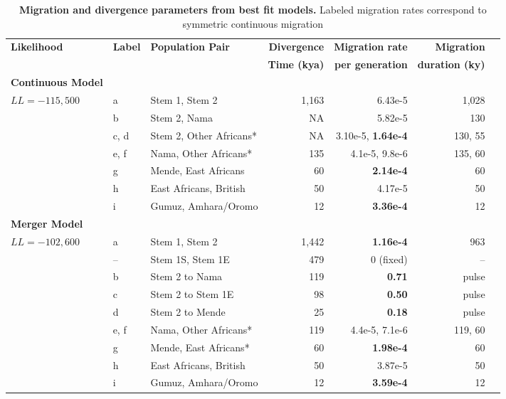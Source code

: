 \documentclass[]{article}
\begin{document}
\begin{table}[t!]
    \centering
    \scriptsize
    \begin{tabular}{lllrrrr}
        \toprule
        \textbf{Likelihood} & \textbf{Label} & \textbf{Population Pair} &
            \textbf{Divergence} & \textbf{Migration rate} & \textbf{Migration} \\
        & & & 
            \textbf{Time (kya)} & \textbf{per generation} & \textbf{duration (ky)} \\
        \midrule
        \textbf{Continuous Model} & & & & & \\
        $LL= -115,500$ & a & Stem 1, Stem 2 & 1,163 & 6.43e-5 & 1,028 \\
        & b & Stem 2, Nama & NA & 5.82e-5 & 130 \\
        & c, d & Stem 2, Other Africans* & NA & 3.10e-5, \textbf{1.64e-4} & 130, 55 \\
        & e, f & Nama, Other Africans* & 135 & 4.1e-5, 9.8e-6 & 135, 60 \\
        & g & Mende, East Africans & 60 & \textbf{2.14e-4} & 60 \\
        & h & East Africans, British & 50 & 4.17e-5 & 50 \\
        & i & Gumuz, Amhara/Oromo & 12 &\textbf{3.36e-4} & 12 \\
        \textbf{Merger Model} & & & & & \\
        $LL= -102,600$ & a & Stem 1, Stem 2 & 1,442 & \textbf{1.16e-4} & 963 \\
        & -- & Stem 1S, Stem 1E & 479 & 0 (fixed) & -- \\
        & b & Stem 2 to Nama & 119 & \textbf{0.71} & pulse \\
        & c & Stem 2 to Stem 1E & 98 & \textbf{0.50} & pulse \\
        & d & Stem 2 to Mende & 25 & \textbf{0.18} & pulse \\
        & e, f & Nama, Other Africans* & 119 & 4.4e-5, 7.1e-6 & 119, 60 \\
        & g & Mende, East Africans* & 60 & \textbf{1.98e-4} & 60 \\
        & h & East Africans, British & 50 & 3.87e-5 & 50 \\
        & i & Gumuz, Amhara/Oromo &12 & \textbf{3.59e-4} & 12 \\
        \bottomrule
    \end{tabular}
    \caption{
        \textbf{Migration and divergence parameters from best fit models.}
        Labeled migration rates correspond to symmetric continuous migration
}
\end{table}
\end{document}
